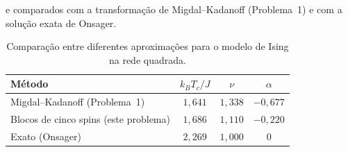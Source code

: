 \documentclass[12pt,a4paper]{article}
\begin{document}
e comparados com a transformação de Migdal--Kadanoff (Problema~1) e
com a solução exata de Onsager.
%
\begin{table}[H]
    \centering
    \caption{
        Comparação entre diferentes aproximações para o modelo de
        Ising na rede quadrada.
    }
    \label{tab:p3_compare}
    \begin{tabular}{lccc}
        \toprule
        Método
        & \(k_BT_c/J\)
        & \(\nu\)
        & \(\alpha\) \\
        \midrule
        Migdal--Kadanoff (Problema~1)
        & \(1{,}641\)
        & \(1{,}338\)
        & \(-0{,}677\) \\
        Blocos de cinco spins (este problema)
        & \(1{,}686\)
        & \(1{,}110\)
        & \(-0{,}220\) \\
        Exato (Onsager)
        & \(2{,}269\)
        & \(1{,}000\)
        & \(0\) \\
        \bottomrule
    \end{tabular}
\end{table}   
\end{document}
